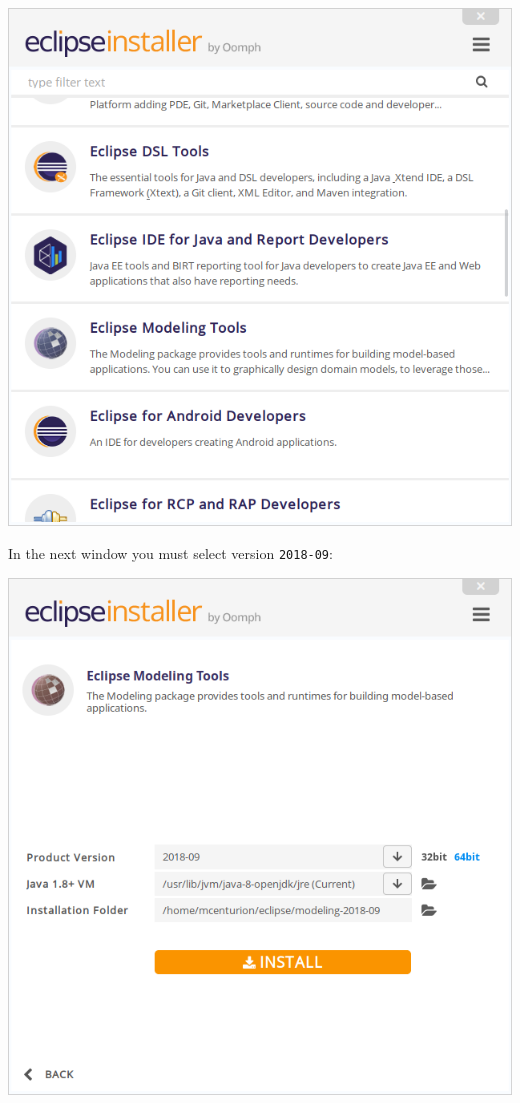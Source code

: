 \documentclass[11pt]{article}
\begin{document}
\begin{center}
\includegraphics[width=.9\linewidth]{images/oomph_main.png}
\end{center}

In the next window you must select version \texttt{2018-09}:

\begin{center}
\includegraphics[width=.9\linewidth]{images/oomph_selection.png}
\end{center}
\end{document}
